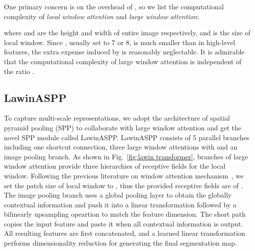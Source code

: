 \documentclass[10pt,twocolumn,letterpaper]{article}
\begin{document}
One primary concern is on the overhead of , so we list the computational complexity of \textit{local window attention} and \textit{large window attention}:

where  and  are the height and width of entire image respectively, and  is the size of local window. Since , usually set to 7 or 8, is much smaller than  in high-level features, the extra expense induced by  is reasonably neglectable. It is admirable that the computational complexity of large window attention is independent of the ratio .




\subsection{LawinASPP}
To capture multi-scale representations, we adopt the architecture of spatial pyramid pooling (SPP) to collaborate with large window attention and get the novel SPP module called LawinASPP. LawinASPP consists of 5 parallel branches including one shortcut connection, three large window attentions with  and an image pooling branch. As shown in Fig.~\ref{fig:lawin transformer}, branches of large window attention provide three hierarchies of receptive fields for the local  window. Following the previous literature on window attention mechanism~\cite{liu2021swin}, we set the patch size of local window to , thus the provided receptive fields are of . The image pooling branch uses a global pooling layer to obtain the globally contextual information and push it into a linear transformation followed by a bilinearly upsampling opeartion to match the feature dimension. The short path copies the input feature and paste it when all contextual information is output. All resulting features are first concatenated, and a learned linear transformation performs dimensionality reduction for generating the final segmentation map. 
\end{document}

